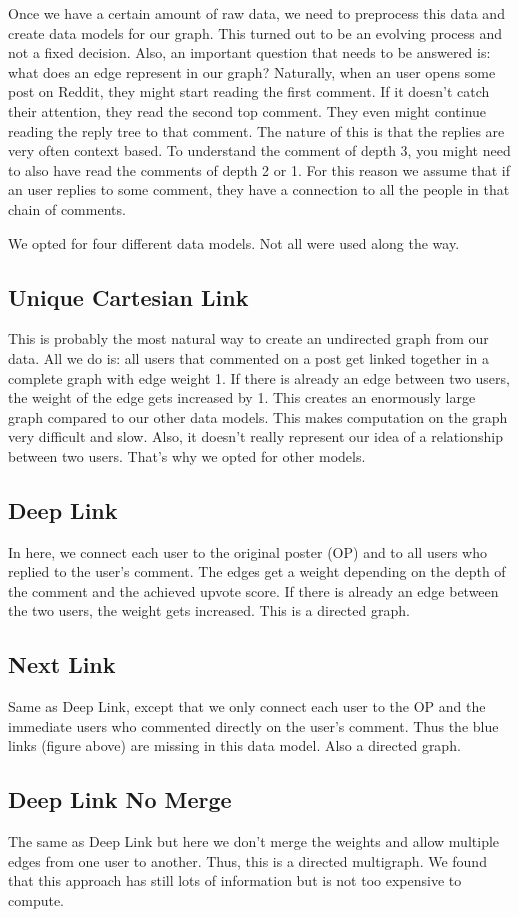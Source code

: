 Once we have a certain amount of raw data, we need to preprocess this data and create data models for our graph. This turned out to be an evolving process and not a fixed decision. Also, an important question that needs to be answered is: what does an edge represent in our graph? Naturally, when an user opens some post on Reddit, they might start reading the first comment. If it doesn't catch their attention, they read the second top comment. They even might continue reading the reply tree to that comment. The nature of this is that the replies are very often context based. To understand the comment of depth 3, you might need to also have read the comments of depth 2 or 1. For this reason we assume that if an user replies to some comment, they have a connection to all the people in that chain of comments. 

We opted for four different data models. Not all were used along the way.

\subsection{Unique Cartesian Link}
This is probably the most natural way to create an undirected graph from our data. All we do is: all users that commented on a post get linked together in a complete graph with edge weight 1. If there is already an edge between two users, the weight of the edge gets increased by 1. This creates an enormously large graph compared to our other data models. This makes computation on the graph very difficult and slow. Also, it doesn't really represent our idea of a relationship between two users. That's why we opted for other models.

\subsection{Deep Link}
In here, we connect each user to the original poster (OP) and to all users who replied to the user's comment. The edges get a weight depending on the depth of the comment and the achieved upvote score. If there is already an edge between the two users, the weight gets increased. This is a directed graph.




\subsection{Next Link}
Same as Deep Link, except that we only connect each user to the OP and the immediate users who commented directly on the user's comment. Thus the blue links (figure above) are missing in this data model. Also a directed graph.

\subsection{Deep Link No Merge}
The same as Deep Link but here we don't merge the weights and allow multiple edges from one user to another. Thus, this is a directed multigraph. We found that this approach has still lots of information but is not too expensive to compute.











